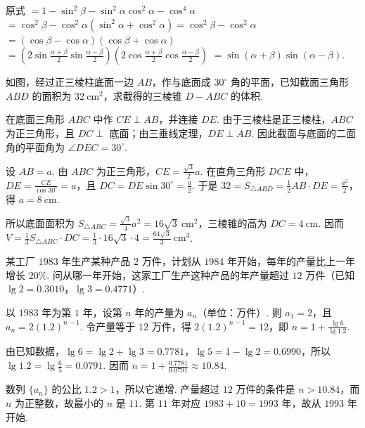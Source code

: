 \begin{solution}
原式 \(=1-\sin^{2}\beta-\sin^{2}\alpha\cos^{2}\alpha-\cos^{4}\alpha\)
\(=\cos^{2}\beta-\cos^{2}\alpha(\sin^{2}\alpha+\cos^{2}\alpha)=\cos^{2}\beta-\cos^{2}\alpha\)
\(=(\cos\beta-\cos\alpha)(\cos\beta+\cos\alpha)\)
\(=\left(2\sin\frac{\alpha+\beta}{2}\sin\frac{\alpha-\beta}{2}\right)\left(2\cos\frac{\alpha+\beta}{2}\cos\frac{\alpha-\beta}{2}\right)\)
\(=\sin(\alpha+\beta)\sin(\alpha-\beta)\).
\end{solution}

\begin{problem}

如图，经过正三棱柱底面一边 \(AB\)，作与底面成 \(30^{\circ}\) 角的平面，已知截面三角形 \(ABD\) 的面积为 \(32\mathrm{~cm}^{2}\)，求截得的三棱锥 \(D - ABC\) 的体积.

\end{problem}

\begin{solution}
在底面三角形 \(ABC\) 中作 \(CE\perp AB\)，并连接 \(DE\). 由于三棱柱是正三棱柱，\(ABC\) 为正三角形，且 \(DC\perp\) 底面；由三垂线定理，\(DE\perp AB\). 因此截面与底面的二面角的平面角为 \(\angle DEC=30^{\circ}\).

设 \(AB=a\). 由 \(ABC\) 为正三角形，\(CE=\frac{\sqrt{3}}{2}a\). 在直角三角形 \(DCE\) 中，\(\displaystyle DE=\frac{CE}{\cos30^{\circ}}=a\)，且 \(DC=DE\sin30^{\circ}=\frac{a}{2}\). 于是 \(\displaystyle32=S_{\triangle ABD}=\frac{1}{2}AB\cdot DE=\frac{a^{2}}{2}\)，得 \(a=8\mathrm{~cm}\).

所以底面面积为 \(S_{\triangle ABC}=\frac{\sqrt{3}}{4}a^{2}=16\sqrt{3}\mathrm{~cm}^{2}\)，三棱锥的高为 \(DC=4\mathrm{~cm}\). 因而 \(\displaystyle V=\frac{1}{3}S_{\triangle ABC}\cdot DC=\frac{1}{3}\cdot16\sqrt{3}\cdot4=\frac{64\sqrt{3}}{3}\mathrm{~cm}^{3}\).
\end{solution}

\begin{problem}

某工厂 \(1983\) 年生产某种产品 \(2\text{ 万件}\)，计划从 \(1984\) 年开始，每年的产量比上一年增长 \(20\%\). 问从哪一年开始，这家工厂生产这种产品的年产量超过 \(12\text{ 万件}\)（已知 \(\lg 2 = 0.3010\)，\(\lg 3 = 0.4771\)）.
\end{problem}

\begin{solution}
以 \(1983\) 年为第 \(1\) 年，设第 \(n\) 年的产量为 \(a_n\)（单位：万件）. 则 \(a_1=2\)，且 \(a_n=2(1.2)^{n-1}\). 令产量等于 \(12\) 万件，得 \(\displaystyle2(1.2)^{n-1}=12\)，即 \(n=1+\frac{\lg6}{\lg1.2}\).

由已知数据，\(\lg6=\lg2+\lg3=0.7781\)，\(\lg5=1-\lg2=0.6990\)，所以 \(\lg1.2=\lg\frac{6}{5}=0.0791\). 因而 \(\displaystyle n=1+\frac{0.7781}{0.0791}\approx10.84\).

数列 \(\{a_n\}\) 的公比 \(1.2>1\)，所以它递增. 产量超过 \(12\) 万件的条件是 \(n>10.84\)，而 \(n\) 为正整数，故最小的 \(n\) 是 \(11\). 第 \(11\) 年对应 \(1983+10=1993\) 年，故从 \(1993\) 年开始.
\end{solution}

